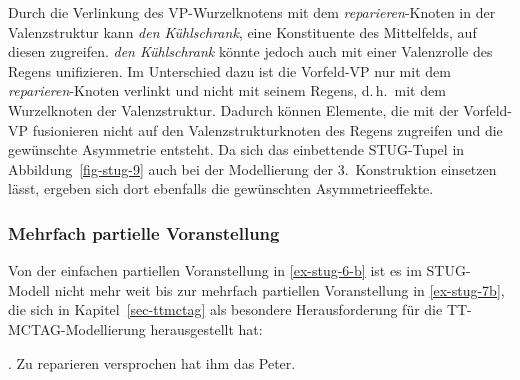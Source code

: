 Durch die Verlinkung des VP-Wurzelknotens mit dem {\it reparieren}-Knoten in der Valenzstruktur kann {\it den Kühlschrank}, eine Konstituente des Mittelfelds, auf diesen zugreifen. {\it den Kühlschrank} könnte jedoch auch mit einer Valenzrolle des Regens unifizieren. Im Unterschied dazu ist die Vorfeld-VP nur mit dem {\it reparieren}-Knoten verlinkt und nicht mit seinem Regens, d.\,h.\ mit dem Wurzelknoten der Valenzstruktur. Dadurch können Elemente, die mit der Vorfeld-VP fusionieren nicht auf den Valenzstrukturknoten des Regens zugreifen und die gewünschte Asymmetrie entsteht. Da sich das einbettende STUG-Tupel in Abbildung~\ref{fig-stug-9} auch bei der Modellierung der 3.~Konstruktion einsetzen lässt, ergeben sich dort ebenfalls die gewünschten Asymmetrieeffekte. 

\subsubsection*{Mehrfach partielle Voranstellung}

Von der einfachen partiellen Voranstellung in \ref{ex-stug-6-b} ist es im STUG-Modell nicht mehr weit bis zur mehrfach partiellen Voranstellung in \ref{ex-stug-7b}, die sich in Kapitel~\ref{sec-ttmctag} als besondere Herausforderung für die TT-MCTAG-Modellierung herausgestellt hat:  

\ex. \label{ex-stug-7b} Zu reparieren versprochen hat ihm das Peter.

